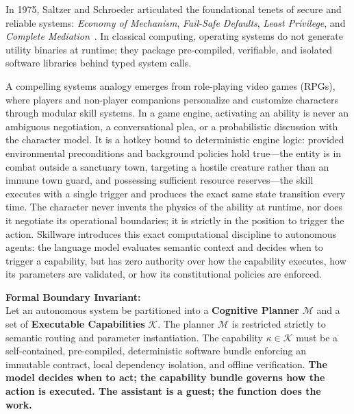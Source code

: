 In 1975, Saltzer and Schroeder articulated the foundational tenets of secure and reliable systems: \emph{Economy of Mechanism}, \emph{Fail-Safe Defaults}, \emph{Least Privilege}, and \emph{Complete Mediation}~\cite{saltzer1975protection}. In classical computing, operating systems do not generate utility binaries at runtime; they package pre-compiled, verifiable, and isolated software libraries behind typed system calls.

A compelling systems analogy emerges from role-playing video games (RPGs), where players and non-player companions personalize and customize characters through modular skill systems. In a game engine, activating an ability is never an ambiguous negotiation, a conversational plea, or a probabilistic discussion with the character model. It is a hotkey bound to deterministic engine logic: provided environmental preconditions and background policies hold true---the entity is in combat outside a sanctuary town, targeting a hostile creature rather than an immune town guard, and possessing sufficient resource reserves---the skill executes with a single trigger and produces the exact same state transition every time. The character never invents the physics of the ability at runtime, nor does it negotiate its operational boundaries; it is strictly in the position to trigger the action. Skillware introduces this exact computational discipline to autonomous agents: the language model evaluates semantic context and decides when to trigger a capability, but has zero authority over how the capability executes, how its parameters are validated, or how its constitutional policies are enforced.

\begin{tcolorbox}[doctrinebox, title={THE PRINCIPLE OF SEPARATION OF COGNITION AND CAPABILITY}]
\textbf{Formal Boundary Invariant:}\\[0.2em]
Let an autonomous system be partitioned into a \textbf{Cognitive Planner} $\mathcal{M}$ and a set of \textbf{Executable Capabilities} $\mathcal{K}$. The planner $\mathcal{M}$ is restricted strictly to semantic routing and parameter instantiation. The capability $\kappa \in \mathcal{K}$ must be a self-contained, pre-compiled, deterministic software bundle enforcing an immutable contract, local dependency isolation, and offline verification. \textbf{The model decides when to act; the capability bundle governs how the action is executed. The assistant is a guest; the function does the work.}
\end{tcolorbox}

